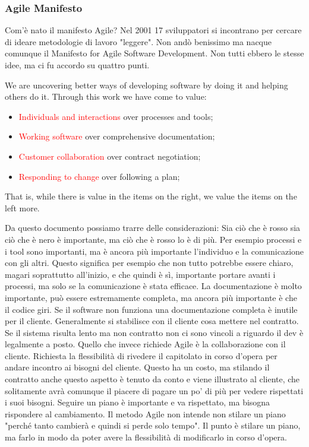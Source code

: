 \begin{itemize}
	\subsubsection{Agile Manifesto}
	Com'è nato il manifesto Agile? Nel 2001 17 sviluppatori si incontrano per cercare di ideare metodologie di lavoro "leggere". Non andò benissimo ma nacque comunque il Manifesto for Agile Software Development. Non tutti ebbero le stesse idee, ma ci fu accordo su quattro punti.
	\begin{info}[MANIFESTO]
		\newline We are uncovering better ways of developing
		software by doing it and helping others do it.\newline
		Through this work we have come to value:
		\begin{itemize}
			\item \textcolor{red}{Individuals and interactions} over processes and tools;
			\item \textcolor{red}{Working software} over comprehensive documentation;
			\item \textcolor{red}{Customer collaboration} over contract negotiation;
			\item \textcolor{red}{Responding to change} over following a plan;
		\end{itemize}
		That is, while there is value in the items on
		the right, we value the items on the left more.
	\end{info}
	Da questo documento possiamo trarre delle considerazioni:\newline
	Sia ciò che è rosso sia ciò che è nero è importante, ma ciò che è rosso lo è di più. Per esempio processi e i tool sono importanti, ma è ancora più importante l'individuo e la comunicazione con gli altri. Questo significa per esempio che non tutto potrebbe essere chiaro, magari soprattutto all'inizio, e che quindi è sì, importante portare avanti i processi, ma solo se la comunicazione è stata efficace.\newline
	La documentazione è molto importante, può essere estremamente completa, ma ancora più importante è che il codice giri. Se il software non funziona una documentazione completa è inutile per il cliente.\newline
	Generalmente si stabilisce con il cliente cosa mettere nel contratto. Se il sistema risulta lento ma non contratto non ci sono vincoli a riguardo il dev è legalmente a posto. Quello che invece richiede Agile è la collaborazione con il cliente. Richiesta la flessibilità di rivedere il capitolato in corso d'opera per andare incontro ai bisogni del cliente. Questo ha un costo, ma stilando il contratto anche questo aspetto è tenuto da conto e viene illustrato al cliente, che solitamente avrà comunque il piacere di pagare un po' di più per vedere rispettati i suoi bisogni.\newline
	Seguire un piano è importante e va rispettato, ma bisogna rispondere al cambiamento. Il metodo Agile non intende non stilare un piano "perché tanto cambierà e quindi si perde solo tempo". Il punto è stilare un piano, ma farlo in modo da poter avere la flessibilità di modificarlo in corso d'opera.
\end{itemize}
